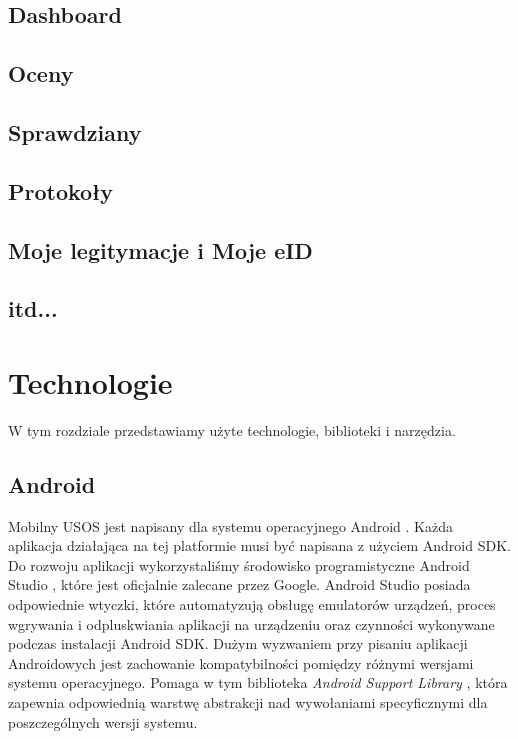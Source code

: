 \documentclass{pracamgr}
\begin{document}
\section{Dashboard}



\section{Oceny}

\section{Sprawdziany}

\section{Protokoły}

\section{Moje legitymacje i Moje eID}

\section{itd...}

\chapter{Technologie}

W tym rozdziale przedstawiamy użyte technologie, biblioteki i narzędzia.

\section{Android}

Mobilny USOS jest napisany dla systemu operacyjnego Android \cite{android}.
Każda aplikacja działająca na tej platformie musi być napisana z użyciem Android
SDK. Do rozwoju aplikacji wykorzystaliśmy środowisko programistyczne Android Studio
\cite{androidstudio}, które jest oficjalnie zalecane przez Google. Android Studio
posiada odpowiednie wtyczki, które automatyzują obsługę emulatorów urządzeń, proces
wgrywania i odpluskwiania aplikacji na urządzeniu oraz czynności wykonywane podczas
instalacji Android SDK. Dużym wyzwaniem przy pisaniu aplikacji Androidowych jest
zachowanie kompatybilności pomiędzy różnymi wersjami systemu operacyjnego. Pomaga
w tym biblioteka \textit{Android Support Library} \cite{androidsupportlibrary},
która zapewnia odpowiednią warstwę abstrakcji nad wywołaniami specyficznymi dla
poszczególnych wersji systemu.
\end{document}
